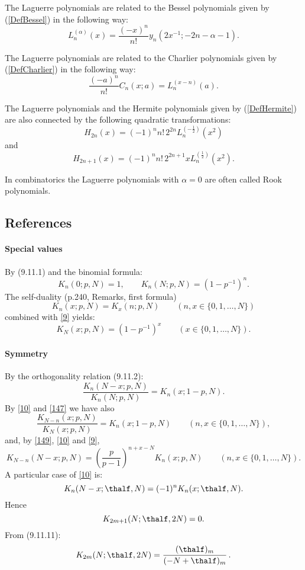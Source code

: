 \documentclass[envcountchap,graybox]{svmono}
\newcounter{rom}
\begin{document}
\noindent
The Laguerre polynomials are related to the Bessel polynomials given by (\ref{DefBessel})
in the following way:
$$L_n^{(\alpha)}(x)=\frac{(-x)^n}{n!}y_n(2x^{-1};-2n-\alpha-1).$$

\noindent
The Laguerre polynomials are related to the Charlier polynomials given by (\ref{DefCharlier})
in the following way:
$$\frac{(-a)^n}{n!}C_n(x;a)=L_n^{(x-n)}(a).$$

\noindent
The Laguerre polynomials and the Hermite polynomials given by (\ref{DefHermite}) are also
connected by the following quadratic transformations:
$$H_{2n}(x)=(-1)^nn!\,2^{2n}L_n^{(-\frac{1}{2})}(x^2)$$
and
$$H_{2n+1}(x)=(-1)^nn!\,2^{2n+1}xL_n^{(\frac{1}{2})}(x^2).$$

\noindent
In combinatorics the Laguerre polynomials with $\alpha=0$ are often called Rook
polynomials.

\subsection*{References}
\label{sec9.11}
%
\paragraph{Special values}
By (9.11.1) and the binomial formula:
\begin{equation}
K_n(0;p,N)=1,\qquad
K_n(N;p,N)=(1-p^{-1})^n.
\label{9}
\end{equation}
The self-duality (p.240, Remarks, first formula)
\begin{equation}
K_n(x;p,N)=K_x(n;p,N)\qquad (n,x\in \{0,1,\ldots,N\})
\label{147}
\end{equation}
combined with \eqref{9} yields:
\begin{equation}
K_N(x;p,N)=(1-p^{-1})^x\qquad(x\in\{0,1,\ldots,N\}).
\label{148}
\end{equation}
%
\paragraph{Symmetry}
By the orthogonality relation (9.11.2):
\begin{equation}
\frac{K_n(N-x;p,N)}{K_n(N;p,N)}=K_n(x;1-p,N).
\label{10}
\end{equation}
By \eqref{10} and \eqref{147} we have also
\begin{equation}
\frac{K_{N-n}(x;p,N)}{K_N(x;p,N)}=K_n(x;1-p,N)
\qquad(n,x\in\{0,1,\ldots,N\}),
\label{149}
\end{equation}
and, by \eqref{149}, \eqref{10} and \eqref{9},
\begin{equation}
K_{N-n}(N-x;p,N)=\left(\frac p{p-1}\right)^{n+x-N}K_n(x;p,N)
\qquad(n,x\in\{0,1,\ldots,N\}).
\label{150}
\end{equation}
A particular case of \eqref{10} is:
\begin{equation}
K_n(N-x;\thalf,N)=(-1)^n K_n(x;\thalf,N).
\label{11}
\end{equation}
Hence
\begin{equation}
K_{2m+1}(N;\thalf,2N)=0.
\label{12}
\end{equation}
From (9.11.11):
\begin{equation}
K_{2m}(N;\thalf,2N)=\frac{(\thalf)_m}{(-N+\thalf)_m}\,.
\label{13}
\end{equation}
%
\end{document}
